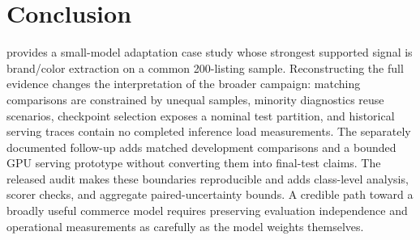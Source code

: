 \section{Conclusion}
\method{} provides a small-model adaptation case study whose strongest supported signal is brand/color extraction on a common 200-listing sample. Reconstructing the full evidence changes the interpretation of the broader campaign: matching comparisons are constrained by unequal samples, minority diagnostics reuse scenarios, checkpoint selection exposes a nominal test partition, and historical serving traces contain no completed inference load measurements. The separately documented follow-up adds matched development comparisons and a bounded GPU serving prototype without converting them into final-test claims. The released audit makes these boundaries reproducible and adds class-level analysis, scorer checks, and aggregate paired-uncertainty bounds. A credible path toward a broadly useful commerce model requires preserving evaluation independence and operational measurements as carefully as the model weights themselves.
